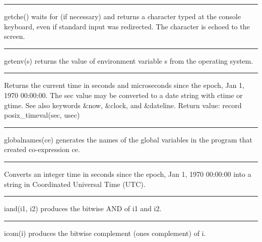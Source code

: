 \bigskip\hrule\vspace{0.1cm}

\noindent
\textsf{getche()} waits for (if necessary) and returns a character typed
at the console keyboard, even if standard input was redirected. The
character is echoed to the screen.

\bigskip\hrule\vspace{0.1cm}

\noindent
\textsf{getenv(s)} returns the value of environment variable \textsf{s} from the operating system.

\bigskip\hrule\vspace{0.1cm}

\noindent
{}Returns the current time in seconds and microseconds
since the epoch, Jan 1, 1970 00:00:00. The \textsf{sec} value may be
converted to a date string with ctime or gtime. See also keywords
\textsf{\&now}, \textsf{\&clock}, and \textsf{\&dateline}. Return
value: \textsf{record posix\_timeval(sec, usec)} 

\bigskip\hrule\vspace{0.1cm}

\noindent
{}\textsf{globalnames(ce)} generates the names of the global
variables in the program that created co-expression \textsf{ce}.

\bigskip\hrule\vspace{0.1cm}

\noindent
Converts an integer time in seconds since the epoch, Jan 1, 1970
00:00:00 into a string in Coordinated Universal Time (UTC). 

\bigskip\hrule\vspace{0.1cm}

\noindent
{}\textsf{iand(i1, i2)} produces the bitwise AND of
\textsf{i1} and \textsf{i2}.

\bigskip\hrule\vspace{0.1cm}

\noindent
\textsf{icom(i)} produces the bitwise complement (one{\textquotesingle}s
complement) of \textsf{i}.

